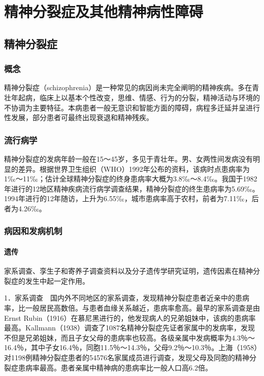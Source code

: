 \chapter{精神分裂症及其他精神病性障碍}

\section{精神分裂症}

\subsection{概念}

精神分裂症（schizophrenia）是一种常见的病因尚未完全阐明的精神疾病。多在青壮年起病，临床上以基本个性改变，思维、情感、行为的分裂，精神活动与环境的不协调为主要特征。本病患者一般无意识和智能方面的障碍，病程多迁延并呈进行性发展，部分患者可最终出现衰退和精神残疾。

\subsection{流行病学}

精神分裂症的发病年龄一般在15～45岁，多见于青壮年。男、女两性间发病没有明显的差异。根据世界卫生组织（WHO）1992年公布的资料，该病时点患病率为1‰～11‰；估计全球精神分裂症的终身患病率大概为3.8‰～8.4‰。我国于1982年进行的12地区精神疾病流行病学调查结果，精神分裂症的终生患病率为5.69‰。1994年进行的12年随访，上升为6.55‰，城市患病率高于农村，前者为7.11‰，后者为4.26‰。

\subsection{病因和发病机制}

\subsubsection{遗传}

家系调查、孪生子和寄养子调查资料以及分子遗传学研究证明，遗传因素在精神分裂症的发生中起一定作用。

1．家系调查　国内外不同地区的家系调查，发现精神分裂症患者近亲中的患病率，比一般居民高数倍。与患者血缘关系越近，患病率愈高。最早的家系调查是由Ernst
Rubin（1916）在慕尼黑进行的，他发现病人的兄弟姐妹中，该病的患病率最高。Kallmann（1938）调查了1087名精神分裂症先证者家属中的发病率，发现不但是兄弟姐妹，而且子女父母的患病率也较高。各级亲属中发病概率为4.3％～16.4％，其中子女16.4％，同胞11.5％～14.3％，父母9.2％～10.3％。上海（1958）对1198例精神分裂症患者的54576名家属成员进行调查，发现父母及同胞的精神分裂症患病率最高。患者亲属中精神病的患病率比一般人口高6.2倍。

